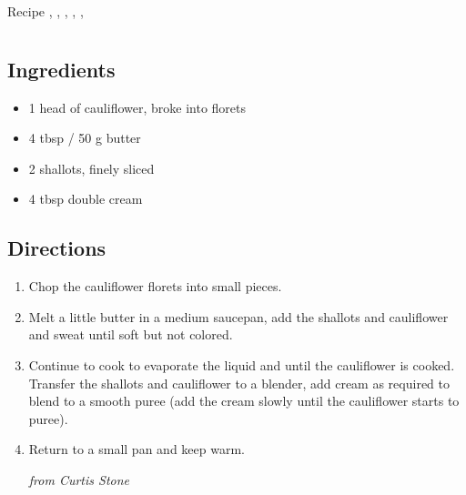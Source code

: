 Recipe
  , 
  , 
  , 
  , 
  , 

\section{ }

\subsection{ Ingredients }

\begin{itemize}
  \item 1 head of cauliflower, broke into florets
  \item 4 tbsp / 50 g butter
  \item 2 shallots, finely sliced
  \item 4 tbsp double cream
\end{itemize}

\subsection{ Directions }

\begin{enumerate}
  \item Chop the cauliflower florets into small pieces. 
  \item Melt a little butter in a medium saucepan, add the shallots and cauliflower and sweat until soft but not colored. 
  \item Continue to cook to evaporate the liquid and until the cauliflower is cooked. Transfer the shallots and cauliflower to a blender, add cream as required to blend to a smooth puree (add the cream slowly until the cauliflower starts to puree). 
  \item Return to a small pan and keep warm. 

\textit{from Curtis Stone}
\end{enumerate}
